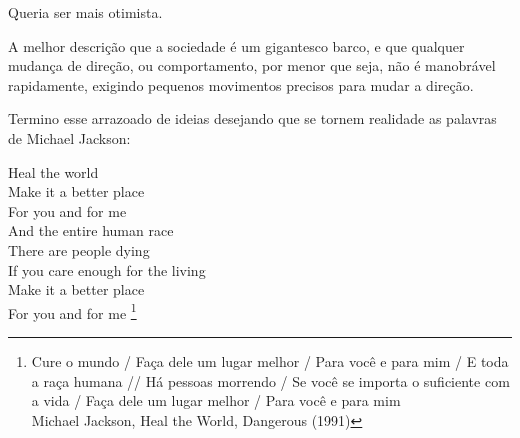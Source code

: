Queria ser mais otimista.

A melhor descrição que a sociedade é um gigantesco barco, e que qualquer mudança de direção, ou comportamento, por menor que seja, não é manobrável rapidamente, exigindo pequenos movimentos precisos para mudar a direção.


Termino esse arrazoado de ideias desejando que se tornem realidade as palavras de Michael Jackson:

\begin{citacao}
    Heal the world\\
    Make it a better place\\
    For you and for me\\
    And the entire human race\\

    There are people dying\\
    If you care enough for the living\\
    Make it a better place\\
    For you and for me \footnote{
        Cure o mundo / Faça dele um lugar melhor / Para você e para mim / E toda a raça humana //
        Há pessoas morrendo / Se você se importa o suficiente com a vida / Faça dele um lugar melhor / Para você e para mim \\
        Michael Jackson, Heal the World, Dangerous (1991)
    }
\end{citacao}
